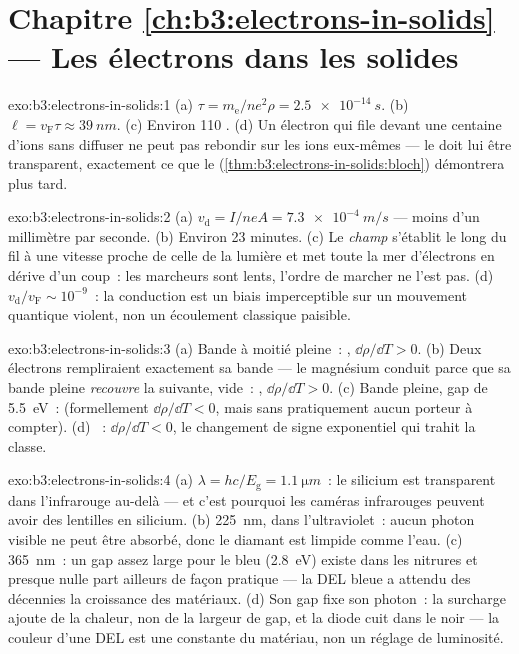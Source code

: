 \section*{Chapitre \ref{ch:b3:electrons-in-solids} --- Les électrons dans les solides}

\begin{solution}{exo:b3:electrons-in-solids:1}
(a) $\tau = m_{\text{e}}/ne^2\rho = \qty{2.5e-14}{s}$. (b) $\ell =
v_{\text{F}}\tau \approx \qty{39}{nm}$. (c) Environ 110 . (d) Un électron qui file devant une centaine d'ions sans
diffuser ne peut pas rebondir sur les ions eux-mêmes --- le 
doit lui être transparent, exactement ce que le 
(\cref{thm:b3:electrons-in-solids:bloch}) démontrera plus tard.
\end{solution}

\begin{solution}{exo:b3:electrons-in-solids:2}
(a) $v_{\text{d}} = I/neA = \qty{7.3e-4}{m/s}$ --- moins d'un
millimètre par seconde. (b) Environ 23 minutes. (c) Le \emph{champ}
s'établit le long du fil à une vitesse proche de celle de la lumière
et met toute la mer d'électrons en dérive d'un coup~: les marcheurs
sont lents, l'ordre de marcher ne l'est pas. (d) $v_{\text{d}}/v_{\text{F}} \sim
10^{-9}$~: la conduction est un biais imperceptible sur un mouvement
quantique violent, non un écoulement classique paisible.
\end{solution}

\begin{solution}{exo:b3:electrons-in-solids:3}
(a) Bande à moitié pleine~: , $\dd\rho/\dd T > 0$. (b) Deux
électrons rempliraient exactement sa bande --- le magnésium conduit
parce que sa bande pleine \emph{recouvre} la suivante, vide~: ,
$\dd\rho/\dd T > 0$. (c) Bande pleine, gap de \qty{5.5}{eV}~:
 (formellement $\dd\rho/\dd T < 0$, mais sans pratiquement
aucun porteur à compter). (d) ~: $\dd\rho/\dd T < 0$,
le changement de signe exponentiel qui trahit la classe.
\end{solution}

\begin{solution}{exo:b3:electrons-in-solids:4}
(a) $\lambda = hc/E_{\text{g}} = \qty{1.1}{\micro m}$~: le silicium
est transparent dans l'infrarouge au-delà --- et c'est pourquoi les
caméras infrarouges peuvent avoir des lentilles en silicium. (b)
\qty{225}{nm}, dans l'ultraviolet~: aucun photon visible ne peut
être absorbé, donc le diamant est limpide comme l'eau. (c)
\qty{365}{nm}~: un gap assez large pour le bleu (\qty{2.8}{eV})
existe dans les nitrures et presque nulle part ailleurs de façon
pratique --- la DEL bleue a attendu des décennies la croissance des
matériaux. (d) Son gap fixe son photon~: la surcharge ajoute de la
chaleur, non de la largeur de gap, et la diode cuit dans le noir ---
la couleur d'une DEL est une constante du matériau, non un réglage
de luminosité.
\end{solution}

